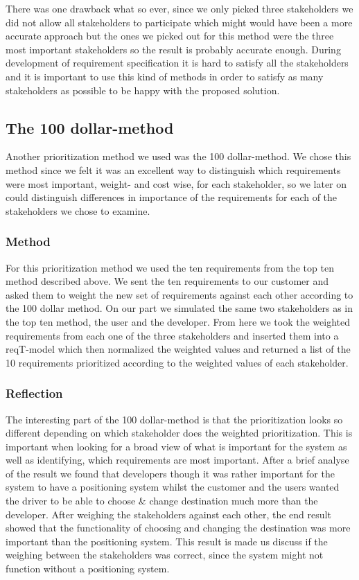 \documentclass[10pt]{article}
\begin{document}
\noindent There was one drawback what so ever, since we only picked three stakeholders we did not allow all stakeholders to participate which might would have been a more accurate approach but the ones we picked out for this method were the three most important stakeholders so the result is probably accurate enough.
During development of requirement specification it is hard to satisfy all the stakeholders and it is important to use this kind of methods in order to satisfy as many stakeholders as possible to be happy with the proposed solution.

\subsection{The 100 dollar-method}
Another prioritization method we used was the 100 dollar-method. We chose this method since we felt it was an excellent way to distinguish which requirements were most important, weight- and cost wise, for each stakeholder, so we later on could distinguish differences in importance of the requirements for each of the stakeholders we chose to examine.
\subsubsection{Method}
For this prioritization method we used the ten requirements from the top ten method described above. We sent the ten requirements to our customer and asked them to weight the new set of requirements against each other according to the 100 dollar method. On our part we simulated the same two stakeholders as in the top ten method, the user and the developer. From here we took the weighted requirements from each one of the three stakeholders and inserted them into a reqT-model which then normalized the weighted values and returned a list of the 10 requirements prioritized according to the weighted values of each stakeholder.
\subsubsection{Reflection}
The interesting part of the 100 dollar-method is that the prioritization looks so different depending on which stakeholder does the weighted prioritization. This is important when looking for a broad view of what is important for the system as well as identifying, which requirements are most important. After a brief analyse of the result we found that developers though it was rather important for the system to have a positioning system whilst the customer and the users wanted the driver to be able to choose & change destination much more than the developer. After weighing the stakeholders against each other, the end result showed that the functionality of choosing and changing the destination was more important than the positioning system. This result is made us discuss if the weighing between the stakeholders was correct, since the system might not function without a positioning system.
\end{document}
